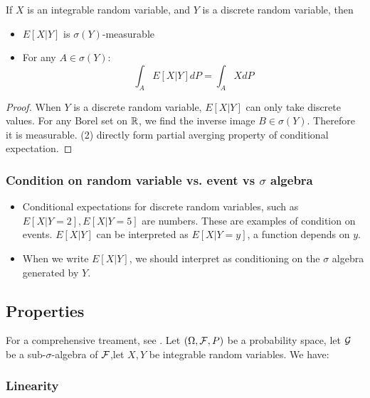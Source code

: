 \begin{refsection}
\begin{lemma}
If $X$ is an integrable random variable, and $Y$ is a discrete random variable, then 
\begin{itemize}
    \item $E[X|Y]$ is $\sigma(Y)$-measurable
    \item For any $A\in \sigma(Y)$:
    $$\int_A E[X|Y]dP = \int_A X dP$$
\end{itemize}
\end{lemma}
\begin{proof}
When $Y$ is a discrete random variable, $E[X|Y]$ can only take discrete values. For any Borel set on $\mathbb{R}$, we find the inverse image $B \in \sigma(Y)$. Therefore it is measurable. (2) directly form partial averging property of conditional expectation.
\end{proof}


\subsubsection{Condition on random variable vs. event vs $\sigma$ algebra}
\begin{itemize}
    \item Conditional expectations for discrete random variables, such as $E[X|Y=2], E[X|Y=5]$ are numbers. These are examples of condition on events.  $E[X|Y]$ can be interpreted as $E[X|Y=y]$, a function depends on $y$. 
    \item When we write $E[X|Y]$, we should interpret as conditioning on the $\sigma$ algebra generated by $Y$.
\end{itemize}

\subsection{Properties}\label{ch:theory-of-probability:th:conditionalexpectationproperty}
For a comprehensive treament, see \cite[70]{mikosch1998elementary}.
Let $(\Omega,\mathcal{F},P)$ be a probability space, let $\mathcal{G}$ be a sub-$\sigma$-algebra of $\mathcal{F}$,let $X,Y$ be integrable random variables. We have:
\subsubsection{Linearity}


\end{refsection}
